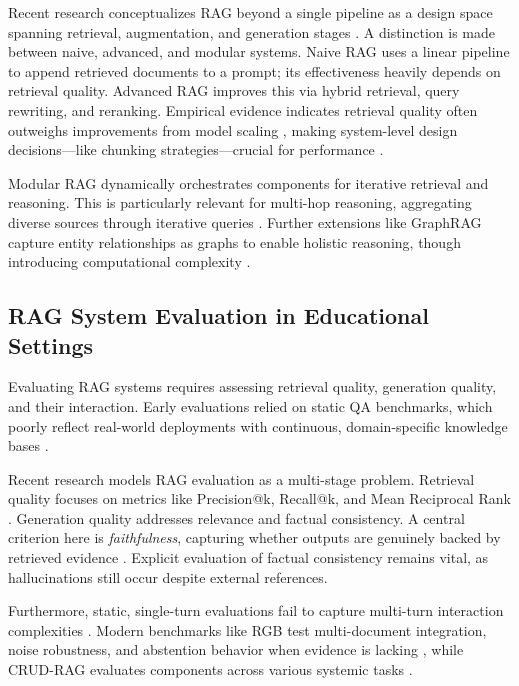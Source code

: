 Recent research conceptualizes RAG beyond a single pipeline as a design space spanning retrieval, augmentation, and generation stages \autocite{zhaoragSurvey}. A distinction is made between naive, advanced, and modular systems. Naive RAG uses a linear pipeline to append retrieved documents to a prompt; its effectiveness heavily depends on retrieval quality. Advanced RAG improves this via hybrid retrieval, query rewriting, and reranking. Empirical evidence indicates retrieval quality often outweighs improvements from model scaling \autocite{liBPRAG}, making system-level design decisions—like chunking strategies—crucial for performance \autocite{zhaoragSurvey}.

Modular RAG dynamically orchestrates components for iterative retrieval and reasoning. This is particularly relevant for multi-hop reasoning, aggregating diverse sources through iterative queries \autocite{MultiHopRAG}. Further extensions like GraphRAG capture entity relationships as graphs to enable holistic reasoning, though introducing computational complexity \autocite{GraphRAG_Grundlage}.

\subsection{RAG System Evaluation in Educational Settings}

Evaluating RAG systems requires assessing retrieval quality, generation quality, and their interaction. Early evaluations relied on static QA benchmarks, which poorly reflect real-world deployments with continuous, domain-specific knowledge bases \autocite{Lewis2020_RAG}.

Recent research models RAG evaluation as a multi-stage problem. Retrieval quality focuses on metrics like Precision@k, Recall@k, and Mean Reciprocal Rank \autocite{manning2008ir, karpukhin2020dpr}. Generation quality addresses relevance and factual consistency. A central criterion here is \textit{faithfulness}, capturing whether outputs are genuinely backed by retrieved evidence \autocite{es2025ragas}. Explicit evaluation of factual consistency remains vital, as hallucinations still occur despite external references.

Furthermore, static, single-turn evaluations fail to capture multi-turn interaction complexities \autocite{Deriu2021}. Modern benchmarks like RGB test multi-document integration, noise robustness, and abstention behavior when evidence is lacking \autocite{chen2023benchmarkinglargelanguagemodels}, while CRUD-RAG evaluates components across various systemic tasks \autocite{CRUDRAG}.

